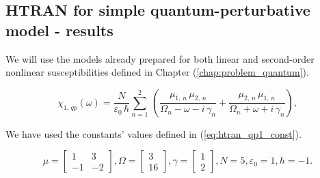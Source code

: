 \documentclass[12pt,twoside,a4paper]{article}
\numberwithin{equation}{subsection}
\numberwithin{figure}{subsection}
\begin{document}
\subsection{HTRAN for simple quantum-perturbative model - results} \label{chap:htran_quantum}

We will use the models already prepared for both linear and second-order nonlinear susceptibilities defined in Chapter
(\ref{chap:problem_quantum}).

\begin{equation} \label{eq:htran_qpeq}
  \chi_{1, \,qp}(\omega ) = 
  \frac{N}{\varepsilon_0\,\hbar} \sum_{n=1}^{2}\,(\frac {{\mu_{1, \,n}}\,{\mu_{2, \,n}}}{{\Omega_{n}} - \omega -
  i\,{\gamma_{n}}} + \frac {{\mu_{2, \,n}}\,{\mu_{1, \,n}}}{{\Omega_{n}} + \omega + i\,{\gamma_{n}}}) ,
\end{equation}

We have used the constants' values defined in (\ref{eq:htran_qp1_const}). 

\begin{equation} \label{eq:htran_qp1_const}
  \mu = \begin{bmatrix} 
          1  & 3 \\ 
          -1 & -2
        \end{bmatrix},
  \Omega = \begin{bmatrix}
           3 \\ 16
           \end{bmatrix},
  \gamma = \begin{bmatrix}
           1 \\ 2
           \end{bmatrix}, 
  N = 5, 
  \varepsilon_0 = 1, 
  h = -1.
\end{equation}
\end{document}
